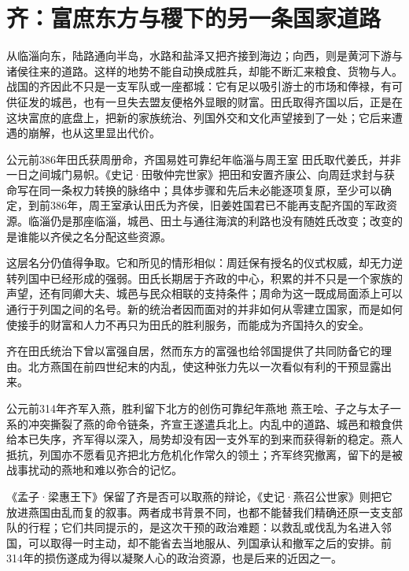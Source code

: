 \section{齐：富庶东方与稷下的另一条国家道路}

从临淄向东，陆路通向半岛，水路和盐泽又把齐接到海边；向西，则是黄河下游与诸侯往来的道路。这样的地势不能自动换成胜兵，却能不断汇来粮食、货物与人。战国的齐因此不只是一支军队或一座都城：它有足以吸引游士的市场和俸禄，有可供征发的城邑，也有一旦失去盟友便格外显眼的财富。田氏取得齐国以后，正是在这块富庶的底盘上，把新的家族统治、列国外交和文化声望接到了一处；它后来遭遇的崩解，也从这里显出代价。

\begin{event}{公元前386年}{田氏获周册命，齐国易姓}{可靠纪年}{临淄与周王室}
田氏取代姜氏，并非一日之间城门易帜。《史记·田敬仲完世家》把田和安置齐康公、向周廷求封与获命写在同一条权力转换的脉络中；具体步骤和先后未必能逐项复原，至少可以确定，到前386年，周王室承认田氏为齐侯，旧姜姓国君已不能再支配齐国的军政资源。临淄仍是那座临淄，城邑、田土与通往海滨的利路也没有随姓氏改变；改变的是谁能以齐侯之名分配这些资源。

这层名分仍值得争取。它和所见的情形相似：周廷保有授名的仪式权威，却无力逆转列国中已经形成的强弱。田氏长期居于齐政的中心，积累的并不只是一个家族的声望，还有同卿大夫、城邑与民众相联的支持条件；周命为这一既成局面添上可以通行于列国之间的名号。新的统治者因而面对的并非如何从零建立国家，而是如何使接手的财富和人力不再只为田氏的胜利服务，而能成为齐国持久的安全。
\end{event}

齐在田氏统治下曾以富强自居，然而东方的富强也给邻国提供了共同防备它的理由。北方燕国在前四世纪末的内乱，使这种张力先以一次看似有利的干预显露出来。

\begin{event}{公元前314年}{齐军入燕，胜利留下北方的创伤}{可靠纪年}{燕地}
燕王哙、子之与太子一系的冲突撕裂了燕的命令链条，齐宣王遂遣兵北上。内乱中的道路、城邑和粮食供给本已失序，齐军得以深入，局势却没有因一支外军的到来而获得新的稳定。燕人抵抗，列国亦不愿看见齐把北方危机化作常久的领土；齐军终究撤离，留下的是被战事扰动的燕地和难以弥合的记忆。

《孟子·梁惠王下》保留了齐是否可以取燕的辩论，《史记·燕召公世家》则把它放进燕国由乱而复的叙事。两者成书背景不同，也都不能替我们精确还原一支支部队的行程；它们共同提示的，是这次干预的政治难题：以救乱或伐乱为名进入邻国，可以取得一时主动，却不能省去当地服从、列国承认和撤军之后的安排。前314年的损伤遂成为得以凝聚人心的政治资源，也是后来的近因之一。
\end{event}

